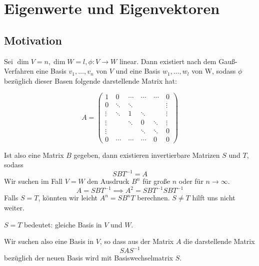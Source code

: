 \documentclass{mycourse}
\begin{document}
\chapter{Eigenwerte und Eigenvektoren}

\section{Motivation}

Sei $\dim V=n, \dim W=l, \phi:V\to W$ linear.
Dann existiert nach dem Gauß-Verfahren eine Basis $v_1,\dotsc,v_n$ von $V$ und eine Basis $w_1,\dotsc,w_l$ von W, sodass
$\phi$ bezüglich dieser Basen folgende darstellende Matrix hat:

\[
 A= \begin{pmatrix}
     1 &\ 0 &\ \cdots &\ \cdots &\ \cdots &\ 0\\
     0 &\ \ddots &\ \ddots &\ &\  &\ \vdots  \\
     \vdots &\ \ddots &\ 1 &\ \ddots &\ &\ \vdots \\
     \vdots &\  &\ \ddots &\ 0 &\ \ddots &\ \vdots \\
     \vdots &\  &\  &\ \ddots &\ \ddots &\  0 \\
     0 &\ \cdots &\ \cdots &\  \cdots &\ 0 &\ 0
    \end{pmatrix}
\]


Ist also eine Matrix $B$ gegeben, dann existieren invertierbare Matrizen $S$ und $T$, sodass
\[
SBT^{-1}=A
\]
Wir suchen im Fall $V=W$ den Ausdruck $B^n$ für große $n$ oder für $n\to\infty$.
\[
A=SBT^{-1} \implies A^2=SBT^{-1}SBT^{-1}
\]
Falls $S=T$, könnten wir leicht $A^n=SB^nT$ berechnen.
$S\neq T$ hilft uns nicht weiter.

$S=T$ bedeutet: gleiche Basis in $V$ und $W$.

Wir suchen also eine Basis in $V$, so dass aus der Matrix $A$ die darstellende Matrix
\[
SAS^{-1}
\]
bezüglich der neuen Basis wird mit Basiswechselmatrix $S$.
\end{document}
